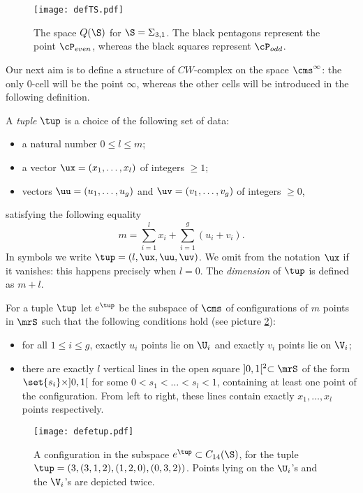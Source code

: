 \begin{figure}\centering
 \texttt{[image: defTS.pdf]}
 \caption{The space $Q(\S)$ for $\S=\Sigma_{3,1}$. The black pentagons represent the point $\cP_{even}$, whereas the black
 squares represent $\cP_{odd}$.}
\label{fig:defTS}
\end{figure}


Our next aim is to define a structure of $CW$-complex on the space $\cms^{\infty}$:
the only $0$-cell will be the point $\infty$, whereas the other cells will be introduced
in the following definition.
\begin{defn}
\label{defn:ehopen}
A \emph{tuple} $\tup$ is a choice of the following set of data:
 \begin{itemize}
  \item a natural number $0\leq l\leq m$;
  \item a vector $\ux=(x_1,\dots, x_l)$ of integers $\geq 1$;
  \item vectors $\uu=(u_1,\dots,u_g)$ and $\uv=(v_1,\dots,v_g)$ of integers $\geq 0$,
 \end{itemize}
satisfying the following equality
\[
 m=\sum_{i=1}^lx_i+\sum_{i=1}^g(u_i+v_i).
\]
In symbols we write $\tup=(l,\ux,\uu,\uv)$. We omit from the notation $\ux$ if it vanishes: this happens precisely when $l=0$.
The \emph{dimension} of $\tup$ is defined as $m+l$.

For a tuple $\tup$ let $e^{\tup}$ be the subspace
of $\cms$ of configurations of $m$ points in $\mrS$ such that the following conditions hold
(see picture \ref{fig:defetup}):
\begin{itemize}
 \item for all $1\leq i\leq g$, exactly $u_i$ points lie on $\U_i$
 and exactly $v_i$ points lie on $\V_i$;
 \item there are exactly $l$ vertical lines in the open square $]0,1[^2\subset\mrS$ of the
 form $\set{s_i}\times]0,1[$ for some $0<s_1<\dots<s_l<1$, containing at least one
 point of the configuration. From left to right, these lines contain exactly $x_1,\dots,x_l$ points
 respectively.
\end{itemize}
\end{defn}


\begin{figure}\centering
 \texttt{[image: defetup.pdf]}
 \caption{A configuration in the subspace $e^{\tup}\subset C_{14}(\S)$, for the tuple $\tup=(3,(3,1,2),(1,2,0),(0,3,2))$. Points
 lying on the $\U_i$'s and the $\V_i$'s are depicted twice.}
\label{fig:defetup}
\end{figure}


